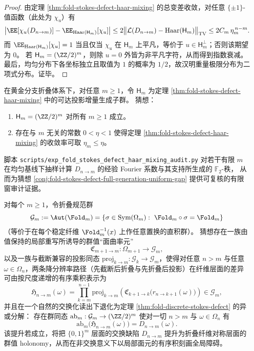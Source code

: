 \begin{proof}
由定理 \ref{thm:fold-stokes-defect-haar-mixing} 的总变差收敛，对任意 \(\{\pm1\}\)-值函数（此处为 \(\chi_u\)）有
\[
\bigl|\EE[\chi_u(D_{n\to m})]-\EE_{\mathrm{Haar}(\mathsf H_m)}[\chi_u]\bigr|
\le 2\bigl\|\mathcal L(D_{n\to m})-\mathrm{Haar}(\mathsf H_m)\bigr\|_{\mathrm{TV}}
\le 2C_m\,\eta_m^{\,n-m}.
\]
而 \(\EE_{\mathrm{Haar}(\mathsf H_m)}[\chi_u]=1\) 当且仅当 \(\chi_u\) 在 \(\mathsf H_m\) 上平凡，等价于 \(u\in\mathsf H_m^\perp\)；否则该期望为 \(0\)。
若 \(\mathsf H_m=(\ZZ/2)^m\)，则除 \(u=0\) 外皆为非平凡字符，从而得到指数衰减。
最后，均匀分布下各坐标独立且取值为 \(1\) 的概率为 \(1/2\)，故汉明重量极限分布为二项式分布。证毕。
\end{proof}

\begin{conjecture}[黄金分支折叠缺陷的全生成性与统一谱隙]\label{conj:fold-stokes-defect-full-generation-uniform-gap}
在黄金分支折叠体系下，对任意 \(m\ge 1\)，令 \(\mathsf H_m\) 为定理 \ref{thm:fold-stokes-defect-haar-mixing} 中的可达投影增量生成子群。
猜想：
\begin{enumerate}
  \item \(\mathsf H_m=(\ZZ/2)^m\) 对所有 \(m\ge 1\) 成立。
  \item 存在与 \(m\) 无关的常数 \(0<\eta<1\) 使得定理 \ref{thm:fold-stokes-defect-haar-mixing} 的收敛率可取 \(\eta_m\le \eta\)。
\end{enumerate}
\end{conjecture}

\begin{remark}[可审计核验接口]\label{rem:fold-stokes-defect-haar-mixing-audit-script}
脚本 \texttt{scripts/exp\_fold\_stokes\_defect\_haar\_mixing\_audit.py} 对若干有限 \(m\) 在均匀基线下抽样计算 \(D_{n\to m}\) 的经验 Fourier 系数与其支持所生成的 \(\mathbb{F}_2\)-秩，
从而为猜想 \ref{conj:fold-stokes-defect-full-generation-uniform-gap} 提供可复核的有限窗审计证据。
\end{remark}

\begin{conjecture}\label{conj:fold-noncommutative-stokes-lift-gauge}
对每个 \(m\ge 1\)，令折叠规范群
\[
\mathcal G_m:=\Aut(\Fold_m)=\{\sigma\in\mathrm{Sym}(\Omega_m):\ \Fold_m\circ\sigma=\Fold_m\}
\]
（等价于在每个稳定纤维 \(\Fold_m^{-1}(x)\) 上作任意置换的直积群）。
猜想存在一族由值保持的局部重写所诱导的群值“面曲率元”
\[
\mathfrak C_{m+1\to m}:\Omega_{m+1}\to \mathcal G_m,
\]
以及一族与截断兼容的投影同态 \(\mathrm{proj}_{k\to m}:\mathcal G_k\to \mathcal G_m\)，使得对任意 \(n>m\) 与任意 \(\omega\in\Omega_n\)，两条降分辨率路径（先截断后折叠与先折叠后投影）在纤维层面的差异可由按尺度递增的有序乘积表示为
\[
\mathfrak H_{n\to m}(\omega)
=\prod_{k=m}^{n-1}\mathrm{proj}_{k\to m}\!\left(\mathfrak C_{k+1\to k}\!\bigl(r_{n\to k+1}(\omega)\bigr)\right)
\in \mathcal G_m,
\]
并且在一个自然的交换化读出下退化为定理 \ref{thm:fold-discrete-stokes-defect} 的异或分解：
存在群同态 \(\mathrm{ab}_m:\mathcal G_m\to(\ZZ/2)^m\) 使对一切 \(n>m\) 与 \(\omega\in\Omega_n\) 有
\[
\mathrm{ab}_m\!\bigl(\mathfrak H_{n\to m}(\omega)\bigr)=D_{n\to m}(\omega).
\]
该提升若成立，将把 \(\{0,1\}^m\) 层面的交换缺陷 \(D_{n\to m}\) 提升为折叠纤维对称层面的群值 holonomy，从而在非交换意义下以局部面元的有序积刻画全局障碍。
\end{conjecture}
